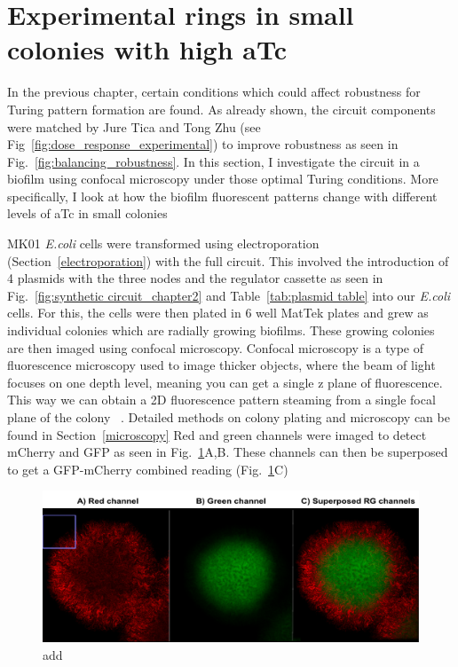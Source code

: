 \section{Experimental rings in small colonies with high aTc}\label{Rings in small colonies with high aTc}
In the previous chapter, certain conditions which could affect robustness for Turing pattern formation are found.
As already shown, the circuit components were matched by Jure Tica and Tong Zhu (see Fig~\ref{fig:dose_response_experimental}) to improve robustness as seen in Fig.~\ref{fig:balancing_robustness}.
In this section, I investigate the circuit in a biofilm using confocal microscopy under those optimal Turing conditions.
More specifically, I look at how the biofilm fluorescent patterns change with different levels of aTc in small colonies

MK01 \textit{E.coli} cells were transformed using electroporation (Section~\ref{electroporation}) with the full circuit.
This involved the introduction of 4 plasmids with the three nodes and the regulator cassette as seen in Fig.~\ref{fig:synthetic circuit_chapter2} and Table~\ref{tab:plasmid table} into our \textit{E.coli} cells.
For this, the cells were then plated in 6 well MatTek plates and grew as individual colonies which are radially growing biofilms.
These growing colonies are then imaged using confocal microscopy.
Confocal microscopy is a type of fluorescence microscopy used to image thicker objects, where the beam of light focuses on one depth level, meaning you can get a single z plane of fluorescence.
This way we can obtain a 2D fluorescence pattern steaming from a single focal plane of the colony ~\parencite{semwogerere2005confocal}.
 Detailed methods on colony plating and microscopy can be found in Section~\ref{microscopy}
Red and green channels were imaged to detect mCherry and GFP as seen in Fig.~\ref{rgchannels}A,B.
These channels can then be superposed to get a GFP-mCherry combined reading (Fig.~\ref{rgchannels}C)
\begin{figure}[H]

    \includegraphics[width=1\textwidth]{chapters/Chapter 3/rgchannels}
    \caption{add}
    \label{rgchannels}
\end{figure}

